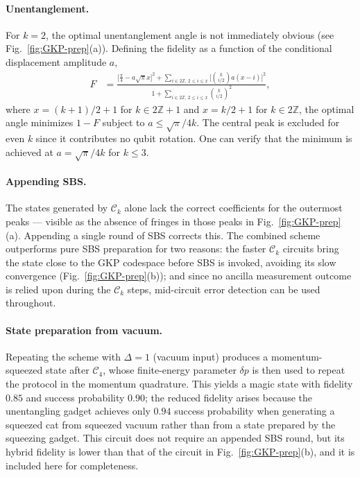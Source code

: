 \documentclass[aps,prx,showpacs,notitlepage,twocolumn,superscriptaddress,nofootinbib,preprintnumbers,floatfix,10pt, longbibliography]{revtex4-2}
\begin{document}
{\paragraph{Unentanglement.}
For $k=2$, the optimal unentanglement angle is not immediately obvious
(see Fig.~\ref{fig:GKP-prep}(a)).  Defining the fidelity as a function of
the conditional displacement amplitude $a$,
\begin{align}
  F &= \frac{\bigl[\frac{\pi}{4}-a\sqrt{\pi}x\bigr]^2
       +\sum_{i\in 2\mathbb{Z},\,2\le i\le x}
        \bigl[\binom{k}{i/2}a(x-i)\bigr]^2}
       {1+\sum_{i\in 2\mathbb{Z},\,2\le i\le x}\binom{k}{i/2}^2},
\end{align}
where $x=(k+1)/2+1$ for $k\in 2\mathbb{Z}+1$ and $x=k/2+1$ for
$k\in 2\mathbb{Z}$, the optimal angle minimizes $1-F$ subject to
$a\le\sqrt{\pi}/4k$.  The central peak is excluded for even $k$ since it
contributes no qubit rotation.  One can verify that the minimum is achieved
at $a=\sqrt{\pi}/4k$ for $k\le 3$.

\paragraph{Appending SBS.}
The states generated by $\mathcal{C}_k$ alone lack the correct coefficients
for the outermost peaks — visible as the absence of fringes in those peaks
in Fig.~\ref{fig:GKP-prep}(a).  Appending a single round of SBS corrects
this.  The combined scheme outperforms pure SBS preparation for two reasons:
the faster $\mathcal{C}_k$ circuits bring the state close to the GKP
codespace before SBS is invoked, avoiding its slow convergence
(Fig.~\ref{fig:GKP-prep}(b)); and since no ancilla measurement outcome is
relied upon during the $\mathcal{C}_k$ steps, mid-circuit error detection
can be used throughout.

\paragraph{State preparation from vacuum.}
Repeating the scheme with $\Delta=1$ (vacuum input) produces a
momentum-squeezed state after $\mathcal{C}_4$, whose finite-energy
parameter $\delta p$ is then used to repeat the protocol in the momentum
quadrature.  This yields a magic state with fidelity $0.85$ and success
probability $0.90$; the reduced fidelity arises because the unentangling
gadget achieves only $0.94$ success probability when generating a squeezed
cat from squeezed vacuum rather than from a state prepared by the squeezing
gadget.  This circuit does not require an appended SBS round, but its
hybrid fidelity is lower than that of the circuit in Fig.~\ref{fig:GKP-prep}(b),
and it is included here for completeness.

}
\end{document}
